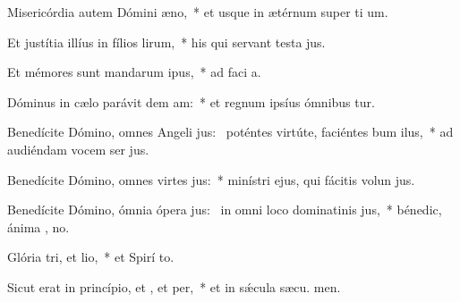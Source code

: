 \item Misericórdia autem Dómini  æno,~* et usque in ætérnum super ti um.
\item Et justítia illíus in fílios lirum,~* his qui servant testa jus.
\item Et mémores sunt mandarum ipus,~* ad faci a.
\item Dóminus in cælo parávit dem am:~* et regnum ipsíus ómnibus tur.
\item Benedícite Dómino, omnes Angeli jus:~\pscross{} poténtes virtúte, faciéntes bum ilus,~* ad audiéndam vocem ser jus.
\item Benedícite Dómino, omnes virtes jus:~* minístri ejus, qui fácitis volun jus.
\item Benedícite Dómino, ómnia ópera jus:~\pscross{} in omni loco dominatinis jus,~* bénedic, ánima , no.
\item Glória tri, et lio,~* et Spirí to.
\item Sicut erat in princípio, et , et per,~* et in sǽcula sæcu. men.
